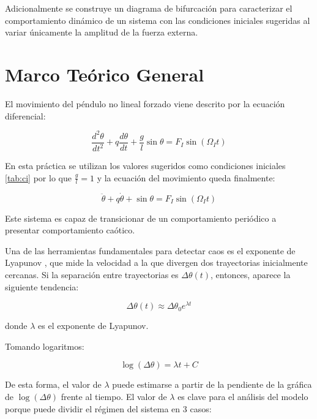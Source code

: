 \documentclass[11pt,a4paper]{article}
\begin{document}
Adicionalmente se construye un diagrama de bifurcación para caracterizar el comportamiento dinámico de un sistema con las condiciones iniciales sugeridas al variar únicamente la amplitud de la fuerza externa.

\section{Marco Teórico General}

El movimiento del péndulo no lineal forzado viene descrito por la ecuación diferencial:

\begin{equation}
\frac{d^2\theta}{dt^2} + q\frac{d\theta}{dt} + \frac{g}{l}\sin\theta = F_I \sin(\Omega_I t)
\end{equation} 


En esta práctica se utilizan los valores sugeridos como condiciones iniciales {\ref{tab:ci}} por lo que $\frac{g}{l}=1$ y la ecuación del movimiento queda finalmente:

\begin{equation}
\ddot{\theta} + q\dot{\theta} + \sin\theta = F_I\sin(\Omega_I t)
\end{equation}

Este sistema es capaz de transicionar de un comportamiento periódico a presentar comportamiento caótico.

Una de las herramientas fundamentales para detectar caos es el exponente de Lyapunov \cite{giordano}, que mide la velocidad a la que divergen dos trayectorias inicialmente cercanas. Si la separación entre trayectorias es $\Delta \theta(t)$, entonces, aparece la siguiente tendencia:

\begin{equation}
\Delta \theta(t) \approx \Delta \theta_0 e^{\lambda t}
\end{equation}

donde $\lambda$ es el exponente de Lyapunov.

Tomando logaritmos:

\begin{equation}
\log(\Delta \theta) = \lambda t + C
\label{eq:lin}
\end{equation}

De esta forma, el valor de $\lambda$ puede estimarse a partir de la pendiente de la gráfica de $\log(\Delta \theta)$ frente al tiempo. El valor de $\lambda$ es clave para el análisis del modelo porque puede dividir el régimen del sistema en 3 casos:
\end{document}
